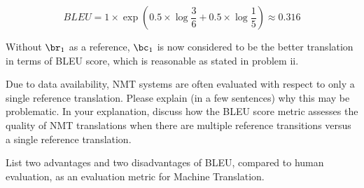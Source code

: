 \begin{parts}
\begin{subparts}
{            $$
                BLEU = 1 \times \exp(0.5 \times \log{\frac{3}{6}} + 0.5 \times \log{\frac{1}{5}}) \approx 0.316
            $$
            

            Without $\br_1$ as a reference, $\bc_1$ is now considered to be the better translation in terms of BLEU score, which is reasonable as stated in problem ii.
        }
        
        
        \subpart[2] Due to data availability, NMT systems are often evaluated with respect to only a single reference translation. Please explain (in a few sentences) why this may be problematic. In your explanation, discuss how the BLEU score metric assesses the quality of NMT translations when there are multiple reference transitions versus a single reference translation.
        
        
        
        \subpart[2] List two advantages and two disadvantages of BLEU, compared to human evaluation, as an evaluation metric for Machine Translation. 
        

\end{subparts}
\end{parts}
